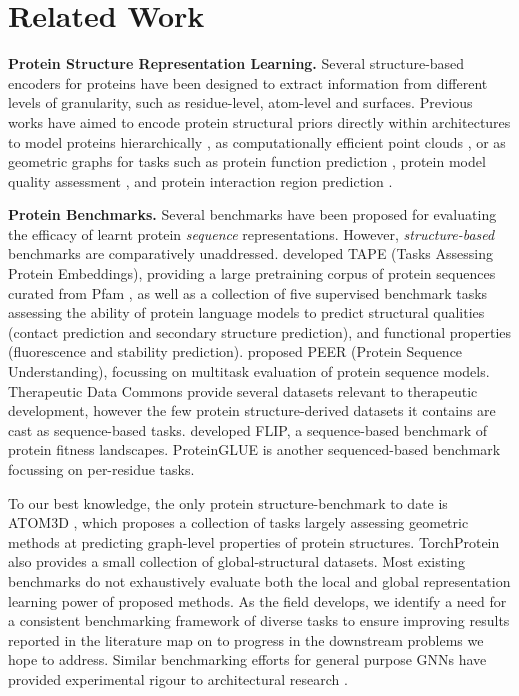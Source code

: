 \section{Related Work}

\textbf{Protein Structure Representation Learning. } Several structure-based encoders for proteins have been designed to extract information from different levels of granularity, such as residue-level, atom-level and surfaces. Previous works have aimed to encode protein structural priors directly within architectures to model proteins hierarchically \citep{somnath2021multi, hermosilla2020intrinsic}, as computationally efficient point clouds \citep{gainza2020deciphering, sverrisson2021fast}, or as geometric graphs \citep{jing2020learning, jin2021iterative, morehead2024geometry, wang2023learning, zhang2023protein, mahmud2023accurate} for tasks such as protein function prediction \citep{Gligorijevi2021}, protein model quality assessment \citep{eismann2020protein, chen20233d, morehead2024gcpnetema}, and protein interaction region prediction \citep{dai2021protein, morehead2023dips}.

\textbf{Protein Benchmarks. } Several benchmarks have been proposed for evaluating the efficacy of learnt protein \emph{sequence} representations. However, \emph{structure-based} benchmarks are comparatively unaddressed. \citet{tape} developed TAPE (Tasks Assessing Protein Embeddings), providing a large pretraining corpus of protein sequences curated from Pfam \citep{ElGebali2018}, as well as a collection of five supervised benchmark tasks assessing the ability of protein language models to predict structural qualities (contact prediction and secondary structure prediction), and functional properties (fluorescence and stability prediction). \citet{peer} proposed PEER (Protein Sequence Understanding), focussing on multitask evaluation of protein sequence models. Therapeutic Data Commons \citep{NEURIPSDATASETSANDBENCHMARKS2021_4c56ff4c} provide several datasets relevant to therapeutic development, however the few protein structure-derived datasets it contains are cast as sequence-based tasks. \citet{NEURIPSDATASETSANDBENCHMARKS2021_2b44928a} developed FLIP, a sequence-based benchmark of protein fitness landscapes. ProteinGLUE \citep{Capel2022} is another sequenced-based benchmark focussing on per-residue tasks.

To our best knowledge, the only protein structure-benchmark to date is ATOM3D \citep{NEURIPSDATASETSANDBENCHMARKS2021_c45147de}, which proposes a collection of tasks largely assessing geometric methods at predicting graph-level properties of protein structures. TorchProtein \citep{zhu2022torchdrug} also provides a small collection of global-structural datasets. Most existing benchmarks do not exhaustively evaluate both the local and global representation learning power of proposed methods. As the field develops, we identify a need for a consistent benchmarking framework of diverse tasks to ensure improving results reported in the literature map on to progress in the downstream problems we hope to address.
Similar benchmarking efforts for general purpose GNNs have provided experimental rigour to architectural research \citep{dwivedi2020benchmarking}.

